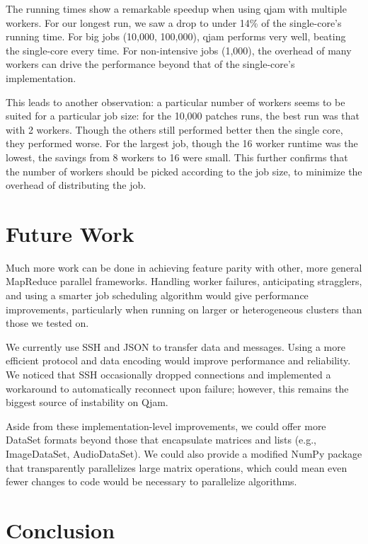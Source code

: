 \documentclass[%
  final,
  notitlepage,
  narroweqnarray,
  inline,
]{ieee}
\begin{document}

The running times show a remarkable speedup when using qjam with multiple
workers. For our longest run, we saw a drop to under 14\% of the single-core's
running time. For big jobs (10,000, 100,000), qjam performs very well, beating
the single-core every time. For non-intensive jobs (1,000), the overhead of many
workers can drive the performance beyond that of the single-core's
implementation.

This leads to another observation: a particular number of workers seems to be
suited for a particular job size: for the 10,000 patches runs, the best run was
that with 2 workers. Though the others still performed better then the single
core, they performed worse. For the largest job, though the 16 worker runtime
was the lowest, the savings from 8 workers to 16 were small. This further
confirms that the number of workers should be picked according to the job size,
to minimize the overhead of distributing the job.

\section{Future Work}

Much more work can be done in achieving feature parity with other, more general
MapReduce parallel frameworks. Handling worker failures, anticipating
stragglers, and using a smarter job scheduling algorithm would give performance
improvements, particularly when running on larger or heterogeneous clusters
than those we tested on.

We currently use SSH and JSON to transfer data and messages. Using a more
efficient protocol and data encoding would improve performance and
reliability. We noticed that SSH occasionally dropped connections and
implemented a workaround to automatically reconnect upon failure; however, this
remains the biggest source of instability on Qjam.

Aside from these implementation-level improvements, we could offer more DataSet
formats beyond those that encapsulate matrices and lists (e.g., ImageDataSet,
AudioDataSet). We could also provide a modified NumPy package that
transparently parallelizes large matrix operations, which could mean even fewer
changes to code would be necessary to parallelize algorithms.


\section{Conclusion}
\end{document}
